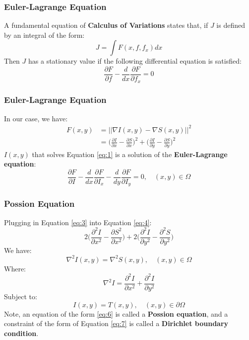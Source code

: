 \documentclass{beamer}
\begin{document}
\begin{frame}
    \frametitle{Euler-Lagrange Equation}
    A fundamental equation of {\bf Calculus of Variations} states that, if $J$ is defined by an integral of the form:
    \[
        J= \int F(x,f, f_x)dx
    \]
    Then $J$ has a stationary value if the following differential equation is satisfied:
    \[
        \frac{\partial F}{\partial f} - \frac{d}{dx}\frac{\partial F}{\partial f_x}=0
    \]
\end{frame}

\begin{frame}
    \frametitle{Euler-Lagrange Equation}
    In our case, we have:
    \begin{equation}
        \label{eq:3}
        \begin{split}
            F(x,y) &= ||\nabla I(x,y) - \nabla S(x,y) ||^{2}  \\ 
                   &= \bigg(\frac{\partial I}{\partial x} - \frac{\partial S}{\partial x}\bigg)^2 
                     + \bigg(\frac{\partial I}{\partial y} - \frac{\partial S}{\partial y}\bigg)^2 
        \end{split}        
    \end{equation}
    $I(x,y)$ that solves Equation \ref{eq:1} is a solution of the {\bf Euler-Lagrange equation}:
    \begin{equation}
        \label{eq:4}
        \frac{\partial F}{\partial I}
        -\frac{d}{dx}\frac{\partial F}{\partial I_x}
        -\frac{d}{dy}\frac{\partial F}{\partial I_y}=0, 
        \quad (x,y) \in \Omega 
    \end{equation}
\end{frame} 


\begin{frame}
    \frametitle{Possion Equation}
    Plugging in Equation \ref{eq:3} into Equation \ref{eq:4}:
    \begin{equation}
        \label{eq:5}
        2\bigg(\frac{\partial^2 I}{\partial x^2}-\frac{\partial S^2}{\partial x^2}\bigg) 
        + 2\bigg(\frac{\partial^2 I}{\partial y^2}-\frac{\partial^2 S}{\partial y^2}\bigg)     
    \end{equation} 
    We have:   
    \begin{equation}
        \label{eq:6}
        \nabla^2 I(x,y) = \nabla^2 S(x,y), \quad (x,y) \in \Omega 
    \end{equation}    
    Where:
    \[
        \nabla^2I=\frac{\partial^2 I}{\partial x^2}+\frac{\partial^2 I}{\partial y^2}
    \]
    Subject to:   
    \begin{equation}
        \label{eq:7}
         I(x,y) = T(x,y), \quad (x,y) \in \partial\Omega 
    \end{equation}        
    Note, an equation of the form \ref{eq:6} is called a {\bf Possion equation}, and a constraint of the form of  Equation \ref{eq:7} is called a {\bf Dirichlet boundary condition}.
\end{frame} 
\end{document}
